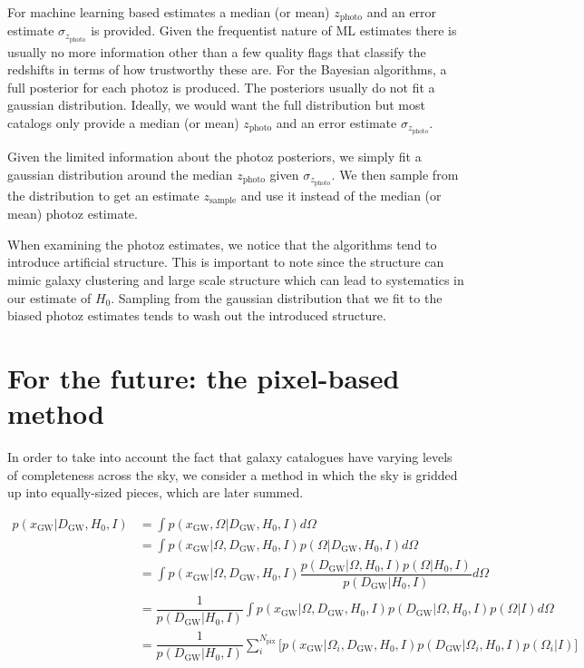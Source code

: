 \documentclass[a4paper,10pt]{article}
\begin{document}
For machine learning based estimates a median (or mean) $z_\text{photo}$ and an error estimate $\sigma_{z_\text{photo}}$ is provided. Given the frequentist nature of ML estimates there is usually no more information other than a few quality flags that classify the redshifts in terms of how trustworthy these are. 
For the Bayesian algorithms, a full posterior for each photoz is produced. The posteriors usually do not fit a gaussian distribution. Ideally, we would want the full distribution but most catalogs only provide a median (or mean) $z_\text{photo}$ and an error estimate $\sigma_{z_\text{photo}}$.

Given the limited information about the photoz posteriors, we simply fit a gaussian distribution around the median $z_\text{photo}$ given $\sigma_{z_\text{photo}}$. We then sample from the distribution to get an estimate $z_\text{sample}$ and use it instead of the median (or mean) photoz estimate.

When examining the photoz estimates, we notice that the algorithms tend to introduce artificial structure. This is important to note since the structure can mimic galaxy clustering and large scale structure which can lead to systematics in our estimate of $H_0$. Sampling from the gaussian distribution that we fit to the biased photoz estimates tends to wash out the introduced structure.


\section{For the future: the pixel-based method \label{Sec: Future}}
In order to take into account the fact that galaxy catalogues have varying levels of completeness across the sky, we consider a method in which the sky is gridded up into equally-sized pieces, which are later summed.

\begin{equation}
\begin{aligned}
p(x_{\text{GW}}|D_{\text{GW}},H_0,I) &= \int p(x_{\text{GW}},\Omega|D_{\text{GW}},H_0,I) d\Omega
\\ & = \int p(x_{\text{GW}}|\Omega,D_{\text{GW}},H_0,I) p(\Omega|D_{\text{GW}},H_0,I) d\Omega
\\ & = \int p(x_{\text{GW}}|\Omega,D_{\text{GW}},H_0,I) \dfrac{p(D_{\text{GW}}|\Omega,H_0,I)p(\Omega|H_0,I)}{p(D_{\text{GW}}|H_0,I)}  d\Omega
\\ &= \dfrac{1}{p(D_{\text{GW}}|H_0,I)} \int p(x_{\text{GW}}|\Omega,D_{\text{GW}},H_0,I) p(D_{\text{GW}}|\Omega,H_0,I)p(\Omega|I) d\Omega
\\ &= \dfrac{1}{p(D_{\text{GW}}|H_0,I)} \sum^{N_{\text{pix}}}_i \bigg[p(x_{\text{GW}}|\Omega_i,D_{\text{GW}},H_0,I) p(D_{\text{GW}}|\Omega_i,H_0,I)p(\Omega_i|I)\bigg]
\end{aligned} 
\end{equation}
\end{document}
